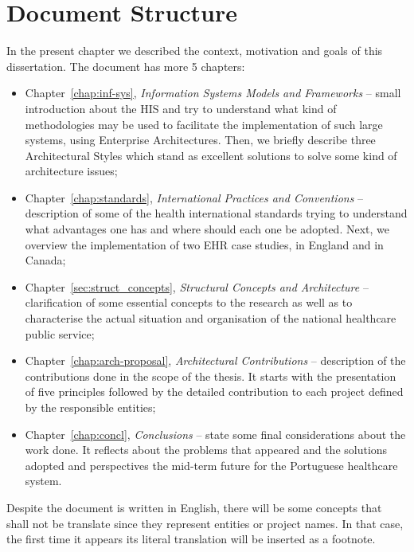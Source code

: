 \section{Document Structure} \label{sec:struct}

In the present chapter we described the context, motivation and goals of this dissertation. The document has more 5 chapters:
\begin{itemize}

\item Chapter~\ref{chap:inf-sys}, \textit{Information Systems Models and Frameworks} -- small introduction about the HIS and try to understand what kind of methodologies may be used to facilitate the implementation of such large systems, using Enterprise Architectures. Then, we briefly describe three Architectural Styles which stand as excellent solutions to solve some kind of architecture issues;

\item Chapter~\ref{chap:standards}, \textit{International Practices and Conventions} -- description of some of the health international standards trying to understand what advantages one has and where should each one be adopted. Next, we overview the implementation of two EHR case studies, in England and in Canada;

\item Chapter~\ref{sec:struct_concepts}, \textit{Structural Concepts and Architecture} -- clarification of some essential concepts to the research as well as to characterise the actual situation and organisation of the national healthcare public service;

\item Chapter~\ref{chap:arch-proposal}, \textit{Architectural Contributions} -- description of the contributions done in the scope of the thesis. It starts with the presentation of five principles followed by the detailed contribution to each project defined by the responsible entities;

\item Chapter~\ref{chap:concl}, \textit{Conclusions} -- state some final considerations about the work done. It reflects about the problems that appeared and the solutions adopted and perspectives the mid-term future for the Portuguese healthcare system.

\end{itemize}


Despite the document is written in English, there will be some concepts that shall not be translate since they represent entities or project names. In that case, the first time it appears its literal translation will be inserted as a footnote.